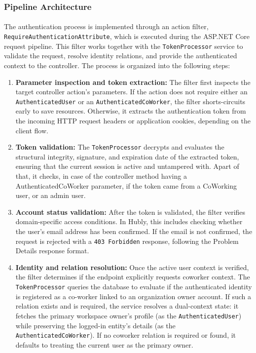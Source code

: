 \subsubsection{Pipeline Architecture}
\paragraph{}The authentication process is implemented through an action filter, \texttt{RequireAuthenticationAttribute}, which is executed during the ASP.NET Core request pipeline. This filter works together with the \texttt{TokenProcessor} service to validate the request, resolve identity relations, and provide the authenticated context to the controller.
The process is organized into the following steps:
\begin{enumerate}
\item \textbf{Parameter inspection and token extraction:} The filter first inspects the target controller action's parameters. If the action does not require either an \texttt{AuthenticatedUser} or an \texttt{AuthenticatedCoWorker}, the filter shorts-circuits early to save resources. Otherwise, it extracts the authentication token from the incoming HTTP request headers or application cookies, depending on the client flow.

\item \textbf{Token validation:} The \texttt{TokenProcessor} decrypts and evaluates the structural integrity, signature, and expiration date of the extracted token, ensuring that the current session is active and untampered with. Apart of that, it checks, in case of the controller method having a AuthenticatedCoWorker parameter, if the token came from a CoWorking user, or an admin user. 

\item \textbf{Account status validation:} After the token is validated, the filter verifies domain-specific access conditions. In Hubly, this includes checking whether the user’s email address has been confirmed. If the email is not confirmed, the request is rejected with a \texttt{403 Forbidden} response, following the Problem Details response format.

\item \textbf{Identity and relation resolution:} Once the active user context is verified, the filter determines if the endpoint explicitly requests coworker context. The \texttt{TokenProcessor} queries the database to evaluate if the authenticated identity is registered as a co-worker linked to an organization owner account. If such a relation exists and is required, the service resolves a dual-context state: it fetches the primary workspace owner's profile (as the \texttt{AuthenticatedUser}) while preserving the logged-in entity's details (as the \texttt{AuthenticatedCoWorker}). If no coworker relation is required or found, it defaults to treating the current user as the primary owner.


\end{enumerate}
